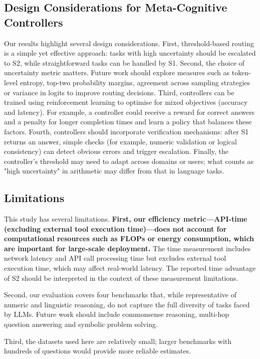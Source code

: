 \documentclass[11pt]{article}
\begin{document}
\subsection{Design Considerations for Meta-Cognitive Controllers}
Our results highlight several design considerations.  First, threshold-based
routing is a simple yet effective approach: tasks with high uncertainty
should be escalated to S2, while straightforward tasks can be handled by S1.
Second, the choice of uncertainty metric matters.  Future work should explore
measures such as token-level entropy, top-two probability margins, agreement across
sampling strategies or variance in logits to improve routing decisions.
Third, controllers can be trained using reinforcement learning to optimise
for mixed objectives (accuracy and latency).  For example, a controller
could receive a reward for correct answers and a penalty for longer
completion times and learn a policy that balances these factors.  Fourth,
controllers should incorporate verification mechanisms: after S1 returns an
answer, simple checks (for example, numeric validation or logical consistency) can
detect obvious errors and trigger escalation.  Finally, the controller's
threshold may need to adapt across domains or users; what counts as "high
uncertainty" in arithmetic may differ from that in language tasks.

\subsection{Limitations}
This study has several limitations.  \textbf{First, our efficiency metric—API-time (excluding external tool execution time)—does not account for computational resources such as FLOPs or energy consumption, which are important for large-scale deployment.} The time measurement includes network latency and API call processing time but excludes external tool execution time, which may affect real-world latency. The reported time advantage of S2 should be interpreted in the context of these measurement limitations.

Second, our evaluation covers four benchmarks that, while representative of numeric and linguistic reasoning, do not capture the full diversity of tasks faced by LLMs. Future work should include commonsense reasoning, multi-hop question answering and symbolic problem solving.

Third, the datasets used here are relatively small; larger benchmarks with hundreds of questions would provide more reliable estimates.
\end{document}
